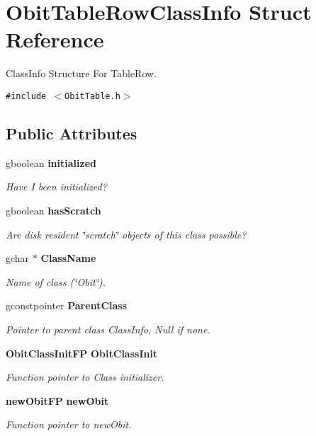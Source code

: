\section{Obit\-Table\-Row\-Class\-Info Struct Reference}
\label{structObitTableRowClassInfo}
Class\-Info Structure For Table\-Row.  


{\tt \#include $<$Obit\-Table.h$>$}

\subsection*{Public Attributes}
\begin{CompactItemize}
\item 
gboolean {\bf initialized}
\begin{CompactList}\small\item\em Have I been initialized? \item\end{CompactList}\item 
gboolean {\bf has\-Scratch}
\begin{CompactList}\small\item\em Are disk resident \char`\"{}scratch\char`\"{} objects of this class possible? \item\end{CompactList}\item 
gchar $\ast$ {\bf Class\-Name}
\begin{CompactList}\small\item\em Name of class (\char`\"{}Obit\char`\"{}). \item\end{CompactList}\item 
gconstpointer {\bf Parent\-Class}
\begin{CompactList}\small\item\em Pointer to parent class Class\-Info, Null if none. \item\end{CompactList}\item 
{\bf Obit\-Class\-Init\-FP} {\bf Obit\-Class\-Init}
\begin{CompactList}\small\item\em Function pointer to Class initializer. \item\end{CompactList}\item 
{\bf new\-Obit\-FP} {\bf new\-Obit}
\begin{CompactList}\small\item\em Function pointer to new\-Obit. \item\end{CompactList}\item 

\end{CompactItemize}
